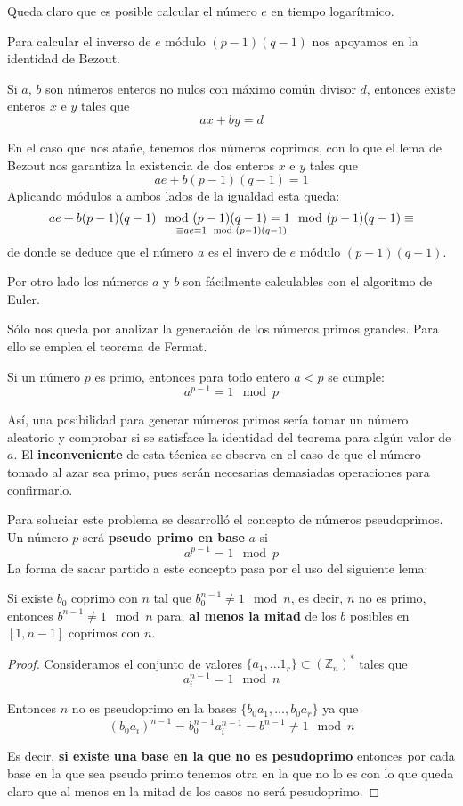 \documentclass[nochap]{apuntesURJC}
\begin{document}
Queda claro que es posible calcular el número $e$ en tiempo logarítmico.

Para calcular el inverso de $e$ módulo $(p-1)(q-1)$ nos apoyamos en la identidad de Bezout.
\begin{lemma}
Si $a$, $b$ son números enteros no nulos con máximo común divisor $d$, entonces existe enteros $x$ e $y$ tales que
\[ax+by=d\]
\end{lemma}

En el caso que nos atañe, tenemos dos números coprimos, con lo que el lema de Bezout nos garantiza la existencia de dos enteros $x$ e $y$ tales que
\[ae + b(p-1)(q-1)=1\]
Aplicando módulos a ambos lados de la igualdad esta queda:
\[ae + b(p-1)(q-1) \mod (p-1)(q-1) = 1 \mod (p-1)(q-1) \equiv\atop \equiv ae = 1 \mod (p-1)(q-1)\]
de donde se deduce que el número $a$ es el invero de $e$ módulo $(p-1)(q-1)$.

Por otro lado los números $a$ y $b$ son fácilmente calculables con el algoritmo de Euler.

Sólo nos queda por analizar la generación de los números primos grandes. Para ello se emplea el teorema de Fermat.
\begin{theorem}
Si un número $p$ es primo, entonces para todo entero $a < p$ se cumple:
\[a^{p-1}=1 \mod p\]
\end{theorem}

Así, una posibilidad para generar números primos sería tomar un número aleatorio y comprobar si se satisface la identidad del teorema para algún valor de $a$. El \textbf{inconveniente} de esta técnica se observa en el caso de que el número tomado al azar sea primo, pues serán necesarias demasiadas operaciones para confirmarlo.

Para soluciar este problema se desarrolló el concepto de números pseudoprimos. Un número $p$ será \textbf{pseudo primo en base} $a$ si
\[a^{p-1}=1 \mod p\]
La forma de sacar partido a este concepto pasa por el uso del siguiente lema:
\begin{lemma}\label{lemma:pseudoprimo}
Si existe $b_0$ coprimo con $n$ tal que $b_0^{n-1}\neq 1 \mod n$, es decir, $n$ no es primo, entonces $b^{n-1} \neq 1 \mod n$ para, \textbf{al menos la mitad} de los $b$ posibles en $[1,n-1]$ coprimos con $n$.
\end{lemma}
\begin{proof}
Consideramos el conjunto de valores $\{a_1,...1_r\} \subset \left(\mathbb{Z}_n\right)^*$ tales que
\[a_i^{n-1} = 1 \mod n\]

Entonces $n$ no es pseudoprimo en la bases $\{b_0a_1,...,b_0a_r\}$ ya que
\[(b_0a_i)^{n-1} = b_0^{n-1}a_i^{n-1} = b^{n-1} \neq 1 \mod n\]

Es decir, \textbf{si existe una base en la que no es pesudoprimo} entonces por cada base en la que sea pseudo primo tenemos otra en la que no lo es con lo que queda claro que al menos en la mitad de los casos no será pesudoprimo.
\end{proof}
\end{document}
